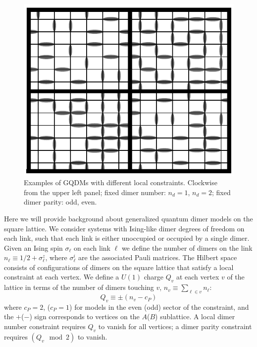 \documentclass[twocolumn,prb,aps,floatfix,superscriptaddress]{revtex4-1}
\begin{document}
\begin{figure}[htpb]
    \centering
    \includegraphics[width=0.9\linewidth]{example_local_constraints.pdf}
    \caption{Examples of GQDMs with different local constraints. Clockwise from the upper left panel; fixed dimer number: $n_d=1$, $n_d=2$;  fixed dimer parity: odd, even.}
    \label{fig:example_local_constraints}
\end{figure}
Here we will provide background about generalized quantum dimer models on the square lattice. We consider systems with Ising-like dimer degrees of freedom on each link, such that each link is either unoccupied or occupied by a single dimer. Given an Ising spin $\sigma_\ell$ on each link $\ell$ we define the number of dimers on the link $n_\ell \equiv 1/2+\sigma_\ell^z$, where $\sigma_\ell^i$ are the associated Pauli matrices. The Hilbert space consists of configurations of dimers on the square lattice that satisfy a local constraint at each vertex. We define a $U(1)$ charge $Q_v$ at each vertex $v$ of the lattice in terms of the number of dimers touching $v$, $n_v\equiv \sum_{\ell \in v}n_\ell$:
\begin{equation}
Q_v \equiv \pm \left( n_v - c_P \right)
\end{equation}
where $c_P = 2$, ($c_P=1$) for models in the even (odd) sector of the constraint, and the $+$($-$) sign corresponds to vertices on the $A$($B$) sublattice. A local dimer number constraint requires $Q_v$ to vanish for all vertices; a dimer parity constraint requires $(Q_v\mod 2)$ to vanish.
 
\end{document}
